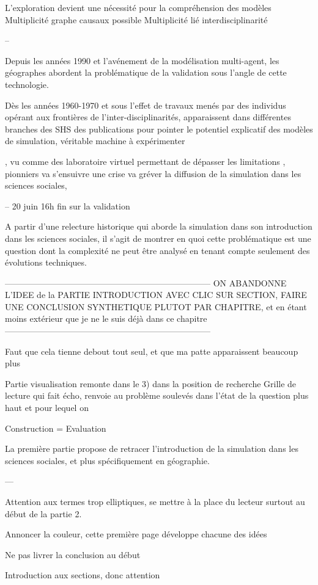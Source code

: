 L'exploration devient une nécessité pour la compréhension des modèles
	Multiplicité graphe causaux possible
	Multiplicité lié interdisciplinarité



--

Depuis les années 1990 et l'avénement de la modélisation multi-agent, les géographes abordent la problématique de la validation sous l'angle de cette technologie.

Dès les années 1960-1970 et sous l'effet de travaux menés par des individus opérant aux frontières de l'inter-disciplinarités, apparaissent dans différentes branches des SHS des publications pour pointer le potentiel explicatif des modèles de simulation, véritable machine à expérimenter 

,  vu comme des laboratoire virtuel permettant de dépasser les limitations  ,  pionniers va s'ensuivre une crise va gréver la diffusion de la simulation dans les sciences sociales, 

--
20 juin 16h fin sur la validation 


A partir d'une relecture historique qui aborde la simulation dans son introduction dans les sciences sociales, il s'agit de montrer en quoi cette problématique est une question dont la complexité ne peut être analysé en tenant compte seulement des évolutions techniques.	

------------------------------------------------------------------------
ON ABANDONNE L'IDEE de la PARTIE INTRODUCTION AVEC CLIC SUR SECTION, FAIRE UNE CONCLUSION SYNTHETIQUE PLUTOT PAR CHAPITRE, et en étant moins extérieur que je ne le suis déjà dans ce chapitre
------------------------------------------------------------------------



Faut que cela tienne debout tout seul, et que ma patte apparaissent beaucoup plus 

Partie visualisation remonte dans le 3) dans la position de recherche
Grille de lecture qui fait écho, renvoie au problème soulevés dans l'état de la question plus haut et pour lequel on 






Construction = Evaluation

La première partie propose de retracer l'introduction de la simulation dans les sciences sociales, et plus spécifiquement en géographie. 




---

Attention aux termes trop elliptiques, se mettre à la place du lecteur surtout au début de la partie 2.

Annoncer la couleur, cette première page développe chacune des idées 


Ne pas livrer la conclusion au début 

Introduction aux sections, donc attention 



\printbibliography[heading=subbibliography]

\stopcontents[chapters]
